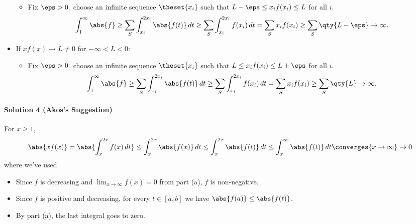 \begin{solution}
\begin{itemize}
  \begin{itemize}
  \tightlist
  \item
    Fix \(\eps> 0\), choose an infinite sequence \(\theset{x_i}\) such
    that \(L-\eps \leq x_i f(x_i) \leq L\) for all \(i\). \begin{align*}
    \int_1^\infty \abs{f} \geq \sum_S \int_{x_i}^{2x_i} \abs{f(t)}\,dt \geq \sum_S \int_{x_i}^{2x_i} f(x_i) \,dt = \sum_S x_i f(x_i) \geq \sum_S \qty{L-\eps} \to \infty
    .\end{align*}
  \end{itemize}
\item
  If \(xf(x) \to L \neq 0\) for \(-\infty < L < 0\):

  \begin{itemize}
  \tightlist
  \item
    Fix \(\eps> 0\), choose an infinite sequence \(\theset{x_i}\) such
    that \(L \leq x_i f(x_i) \leq L + \eps\) for all \(i\).
    \begin{align*}
    \int_1^\infty \abs{f} \geq \sum_S \int_{x_i}^{2x_i} \abs{f(t)}\,dt \geq \sum_S \int_{x_i}^{2x_i} f(x_i) \,dt = \sum_S x_i f(x_i) \geq \sum_S \qty{L} \to \infty
    .\end{align*}
  \end{itemize}
\end{itemize}

\hypertarget{solution-4-akoss-suggestion}{%
\paragraph{Solution 4 (Akos's
Suggestion)}\label{solution-4-akoss-suggestion}}

For \(x\geq 1\), \begin{align*}
\abs{xf(x)} = \abs{ \int_x^{2x} f(x) \, dt } \leq \int_x^{2x} \abs{f(x)} \, dt \leq \int_x^{2x} \abs{f(t)}\, dt \leq \int_x^{\infty} \abs{f(t)} \,dt \converges{x\to\infty}\to 0
\end{align*} where we've used

\begin{itemize}
\tightlist
\item
  Since \(f\) is decreasing and \(\lim_{x\to\infty}f(x) =0\) from part
  (a), \(f\) is non-negative.
\item
  Since \(f\) is positive and decreasing, for every \(t\in[a, b]\) we
  have \(\abs{f(a)} \leq \abs{f(t)}\).
\item
  By part (a), the last integral goes to zero.
\end{itemize}


\end{solution}
